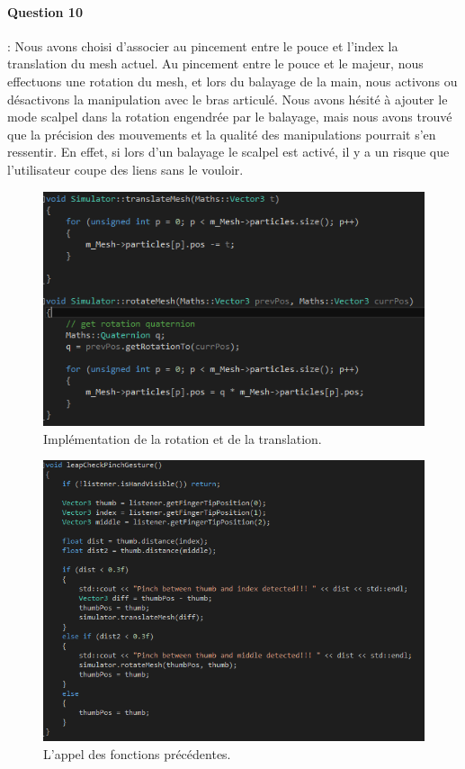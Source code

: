 \documentclass[a4paper,12pt]{article}
\begin{document}
\paragraph{Question 10} : Nous avons choisi d'associer au pincement entre le pouce et l'index la translation du mesh actuel. Au pincement entre le pouce et le majeur, nous effectuons une rotation du mesh, et lors du balayage de la main, nous activons ou désactivons la manipulation avec le bras articulé. Nous avons hésité à ajouter le mode \og{}scalpel\fg{} dans la rotation engendrée par le balayage, mais nous avons trouvé que la précision des mouvements et la qualité des manipulations pourrait s'en ressentir. En effet, si lors d'un balayage le scalpel est activé, il y a un risque que l'utilisateur coupe des liens sans le vouloir.
\begin{figure}[ht!]
  \centering
  \includegraphics[width=\textwidth]{images/swipe_pinch_code.png}
  \caption{Implémentation de la rotation et de la translation.}
  \label{fig:pinchSwipe}
\end{figure}
\begin{figure}[ht!]
  \centering
  \includegraphics[width=\textwidth]{images/swipe_pinch_appel.png}
  \caption{L'appel des fonctions précédentes.}
  \label{fig:pinchCall}
\end{figure}
\end{document}
